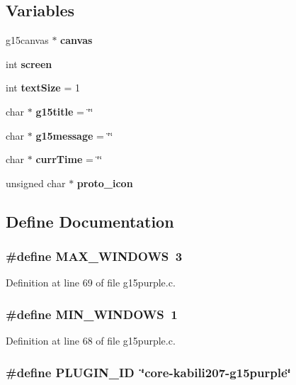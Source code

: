 \subsection*{Variables}
\begin{CompactItemize}
\item 
g15canvas $\ast$ {\bf canvas}
\item 
int {\bf screen}
\item 
int {\bf textSize} = 1
\item 
char $\ast$ {\bf g15title} = \char`\"{}\char`\"{}
\item 
char $\ast$ {\bf g15message} = \char`\"{}\char`\"{}
\item 
char $\ast$ {\bf currTime} = \char`\"{}\char`\"{}
\item 
unsigned char $\ast$ {\bf proto\_\-icon}
\end{CompactItemize}


\subsection{Define Documentation}
\subsubsection{\setlength{\rightskip}{0pt plus 5cm}\#define MAX\_\-WINDOWS~3}\label{g15purple_8c_96f609b2a30e2dc3cc404945cdb2d55e}




Definition at line 69 of file g15purple.c.
\subsubsection{\setlength{\rightskip}{0pt plus 5cm}\#define MIN\_\-WINDOWS~1}\label{g15purple_8c_1908236606322549825ed3994b7ea62d}




Definition at line 68 of file g15purple.c.
\subsubsection{\setlength{\rightskip}{0pt plus 5cm}\#define PLUGIN\_\-ID~\char`\"{}core-kabili207-g15purple\char`\"{}}\label{g15purple_8c_59c02ee71cc1cc5155a9b77e312ff6cd}




